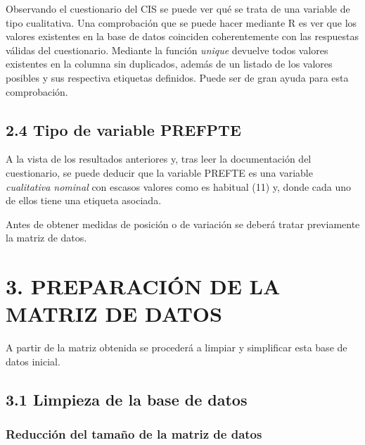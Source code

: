 \documentclass[
  12 pt,
  a4paper,
]{article}
\newenvironment{Shaded}{\begin{snugshade}}{\end{snugshade}}
\newcommand{\CommentTok}[1]{\textcolor[rgb]{0.56,0.35,0.01}{\textit{#1}}}
\newcommand{\FunctionTok}[1]{\textcolor[rgb]{0.13,0.29,0.53}{\textbf{#1}}}
\newcommand{\NormalTok}[1]{#1}
\newcommand{\SpecialCharTok}[1]{\textcolor[rgb]{0.81,0.36,0.00}{\textbf{#1}}}
\begin{document}
Observando el cuestionario del CIS se puede ver qué se trata de una
variable de tipo cualitativa. Una comprobación que se puede hacer
mediante R es ver que los valores existentes en la base de datos
coinciden coherentemente con las respuestas válidas del cuestionario.
Mediante la función \emph{unique} devuelve todos valores existentes en
la columna sin duplicados, además de un listado de los valores posibles
y sus respectiva etiquetas definidos. Puede ser de gran ayuda para esta
comprobación.

\begin{Shaded}
\end{Shaded}

\hypertarget{tipo-de-variable-prefpte}{%
\subsection{2.4 Tipo de variable
PREFPTE}\label{tipo-de-variable-prefpte}}

A la vista de los resultados anteriores y, tras leer la documentación
del cuestionario, se puede deducir que la variable PREFTE es una
variable \emph{cualitativa nominal} con escasos valores como es habitual
(11) y, donde cada uno de ellos tiene una etiqueta asociada.

Antes de obtener medidas de posición o de variación se deberá tratar
previamente la matriz de datos.

\newpage

\hypertarget{preparaciuxf3n-de-la-matriz-de-datos}{%
\section{3. PREPARACIÓN DE LA MATRIZ DE
DATOS}\label{preparaciuxf3n-de-la-matriz-de-datos}}

A partir de la matriz obtenida se procederá a limpiar y simplificar esta
base de datos inicial.

\hypertarget{limpieza-de-la-base-de-datos}{%
\subsection{3.1 Limpieza de la base de
datos}\label{limpieza-de-la-base-de-datos}}

\hypertarget{reducciuxf3n-del-tamauxf1o-de-la-matriz-de-datos}{%
\subsubsection{Reducción del tamaño de la matriz de
datos}\label{reducciuxf3n-del-tamauxf1o-de-la-matriz-de-datos}}
\end{document}
